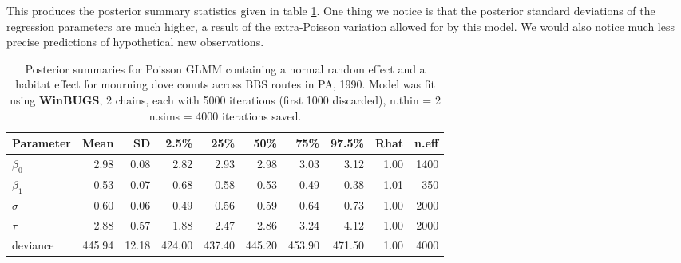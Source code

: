 This produces the posterior summary statistics given in table \ref{glms.tab.bbspoisreg}. 
One thing we notice is
that the posterior standard deviations of the regression parameters
are much higher, a result of the extra-Poisson variation allowed for
by this model. We would also
notice much less precise predictions of hypothetical new
observations.



\begin{table}
\caption{Posterior summaries for Poisson GLMM containing a normal random effect
and a  habitat effect for mourning
  dove counts across BBS routes in PA, 1990. Model was fit using 
{\bf WinBUGS},
 2 chains, each with 5000 iterations (first 1000 discarded), n.thin = 2
 n.sims = 4000 iterations saved.}
   \scriptsize
  \begin{tabular}{lrrrrrrrrr}
    \hline
        \hline
 Parameter &    Mean   & SD   &  2.5\%    &  25\%  &    50\%   &   75\%  &  97.5\% & Rhat & n.eff \\
     \hline
$\beta_0$   &   2.98 & 0.08 &  2.82 &  2.93  & 2.98 &  3.03 &  3.12 & 1.00 & 1400 \\
$\beta_1$   &  -0.53 & 0.07 & -0.68 & -0.58 & -0.53 & -0.49 & -0.38 & 1.01 &  350 \\
$\sigma$   &   0.60 & 0.06 &  0.49 &  0.56 &  0.59 &  0.64 &  0.73 & 1.00 & 2000 \\
$\tau$     &   2.88 & 0.57 &  1.88 &  2.47 &  2.86 &  3.24 &  4.12 & 1.00 & 2000 \\
deviance & 445.94 & 12.18 & 424.00 & 437.40 & 445.20 & 453.90 & 471.50 & 1.00 & 4000 \\
    \hline
  \end{tabular}
  \label{glms.tab.bbspoisreg}
\vspace{0.5cm}
\end{table}



